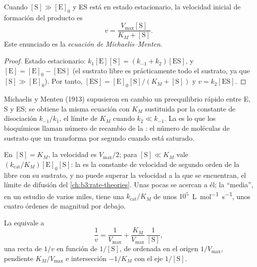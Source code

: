 \begin{theorem}\label{thm:b3:complex-kinetics:michaelis-menten}
Cuando $[\mathrm S] \gg [\mathrm E]_0$ y ES está en estado estacionario, la velocidad inicial de formación
del producto es
\[
  v = \frac{V_{\max}[\mathrm S]}{K_M + [\mathrm S]} .
\]
Este enunciado es la \emph{ecuación de Michaelis--Menten}.
\end{theorem}

\begin{proof}
Estado estacionario: $k_1[\mathrm E][\mathrm S] = (k_{-1} + k_2)[\mathrm{ES}]$, y $[\mathrm E] = [\mathrm E]_0 - [\mathrm{ES}]$ (el sustrato
libre es prácticamente todo el sustrato, ya que $[\mathrm S] \gg [\mathrm E]_0$). Por tanto, $[\mathrm{ES}]
= [\mathrm E]_0[\mathrm S]/(K_M + [\mathrm S])$ y $v = k_2[\mathrm{ES}]$.
\end{proof}

\begin{remark}
Michaelis y Menten (1913) supusieron en cambio un preequilibrio rápido entre E, S y
ES; se obtiene la misma ecuación con $K_M$ sustituida por la constante de disociación
$k_{-1}/k_1$, el límite de $K_M$ cuando $k_2 \ll k_{-1}$. La  es lo que
los bioquímicos llaman número de recambio de la : el número de moléculas de sustrato
que un  transforma por segundo cuando está saturado.
\end{remark}

En $[\mathrm S] = K_M$, la velocidad es $V_{\max}/2$; para $[\mathrm S] \ll K_M$ vale $(k_{\mathrm{cat}}/K_M)[\mathrm E]_0[\mathrm S]$: la
 es la constante de velocidad de segundo orden de la  libre con
su sustrato, y no puede superar la velocidad a la que se encuentran, el
límite de difusión del \cref{ch:b3:rate-theories}. Unas pocas  se acercan a él; la 
``media'', en un estudio de varios miles, tiene una $k_{\mathrm{cat}}/K_M$ de unos
$10^5$~\unit{L.mol^{-1}.s^{-1}}, unos cuatro órdenes de magnitud por debajo.

\begin{proposition}\label{prop:b3:complex-kinetics:lineweaver}
La  equivale a
\[
  \frac1v = \frac{1}{V_{\max}} + \frac{K_M}{V_{\max}}\,\frac{1}{[\mathrm S]},
\]
una recta de $1/v$ en función de $1/[\mathrm S]$, de ordenada en el origen $1/V_{\max}$, pendiente $K_M/V_{\max}$ e
intersección $-1/K_M$ con el eje $1/[\mathrm S]$.
\end{proposition}

